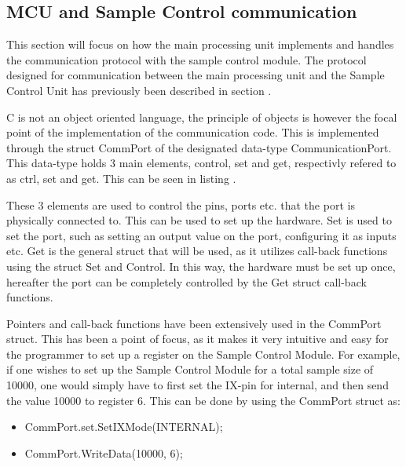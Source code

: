 \subsection{MCU and Sample Control communication} \label{subsec:MCUSCCommunication} 
This section will focus on how the main processing unit implements and handles the communication protocol with the sample control module. 
The protocol designed for communication between the main processing unit and the Sample Control Unit has previously been described in section .

C is not an object oriented language, the principle of objects is however the focal point of the implementation of the communication code. This is implemented through the struct CommPort of the designated data-type CommunicationPort. This data-type holds 3 main elements, control, set and get, respectivly refered to as ctrl, set and get. This can be seen in listing .



These 3 elements are used to control the pins, ports etc. that the port is physically connected to. This can be used to set up the hardware. Set is used to set the port, such as setting an output value on the port, configuring it as inputs etc. Get is the general struct that will be used, as it utilizes call-back functions using the struct Set and Control. In this way, the hardware must be set up once, hereafter the port can be completely controlled by the Get struct call-back functions. 

Pointers and call-back functions have been extensively used in the CommPort struct. This has been a point of focus, as it makes it very intuitive and easy for the programmer to set up a register on the Sample Control Module. For example, if one wishes to set up the Sample Control Module for a total sample size of 10000, one would simply have to first set the IX-pin for internal, and then send the value 10000 to register 6. This can be done by using the CommPort struct as:

\begin{itemize}
    \item CommPort.set.SetIXMode(INTERNAL);
    \item CommPort.WriteData(10000, 6);
\end{itemize}

